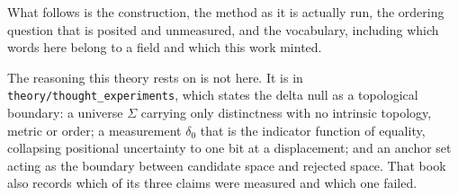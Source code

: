 What follows is the construction, the method as it is actually run, the ordering question that is
posited and unmeasured, and the vocabulary, including which words here belong to a field and which
this work minted.

The reasoning this theory rests on is not here. It is in \texttt{theory/\allowbreak{}thought\_\allowbreak{}experiments}, which states the delta null as a topological boundary: a universe $\Sigma$ carrying only distinctness with no intrinsic topology, metric or order; a measurement $\delta_0$ that is the indicator function of equality, collapsing positional uncertainty to one bit at a displacement; and an anchor set acting as the boundary between candidate space and rejected space. That book also records which of its three claims were measured and which one failed.
\cleardoublepage
